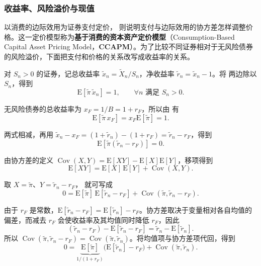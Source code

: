 \begingroup
\renewcommand{\thewjFigure}{\thechapter.S\arabic{wjFigure}}%
\endgroup

\subsubsection{收益率、风险溢价与现值}
 以消费的边际效用为证券支付定价， 则说明支付与边际效用的协方差怎样调整价格。这一定价模型称为\textbf{基于消费的资本资产定价模型}（Consumption-Based Capital Asset Pricing Model，\textbf{CCAPM}）。为了比较不同证券相对于无风险债券的风险溢价，下面把支付和价格的关系改写成收益率的关系。

对 $S_n>0$ 的证券，记总收益率 $\tilde x_n=\widetilde X_n/S_n$，净收益率 $\tilde r_n=\tilde x_n-1$。将 两边除以 $S_n$，得到
\begin{equation}
 \mathrm E[\widetilde\pi\,\tilde x_n]=1,
 \qquad \forall n\text{ 满足 } S_n>0.
 \label{eq:wj-10-19}
\end{equation}

无风险债券的总收益率为 $x_F=1/B=1+r_F$，所以由 有
\[
 \mathrm E[\widetilde\pi\,x_F]=x_F\mathrm E[\widetilde\pi]=1.
\]

两式相减，再用 $\tilde x_n-x_F=(1+\tilde r_n)-(1+r_F)=\tilde r_n-r_F$，得到
\begin{equation}
 \mathrm E[\widetilde\pi(\tilde r_n-r_F)]=0.
 \label{eq:wj-10-20}
\end{equation}

由协方差的定义 $\operatorname{Cov}(X,Y)=\mathrm E[XY]-\mathrm E[X]\mathrm E[Y]$，移项得到
\[
 \mathrm E[XY]=\mathrm E[X]\,\mathrm E[Y]+\operatorname{Cov}(X,Y).
\]

取 $X=\widetilde\pi$、$Y=\tilde r_n-r_F$， 就可写成
\[
 0=\mathrm E[\widetilde\pi]\,\mathrm E[\tilde r_n-r_F]
   +\operatorname{Cov}(\widetilde\pi,\tilde r_n-r_F).
\]

由于 $r_F$ 是常数，$\mathrm E[\tilde r_n-r_F]=\mathrm E[\tilde r_n]-r_F$。协方差取决于变量相对各自均值的偏差，而减去 $r_F$ 会使收益率及其均值同时降低 $r_F$，因此
\[
 (\tilde r_n-r_F)-\mathrm E[\tilde r_n-r_F]
 =\tilde r_n-\mathrm E[\tilde r_n].
\]
所以 $\operatorname{Cov}(\widetilde\pi,\tilde r_n-r_F)=\operatorname{Cov}(\widetilde\pi,\tilde r_n)$。将均值项与协方差项代回，得到
\[
 0=\underbrace{\mathrm E[\widetilde\pi]}_{1/(1+r_F)}
   \bigl(\mathrm E[\tilde r_n]-r_F\bigr)+\operatorname{Cov}(\widetilde\pi,\tilde r_n).
\]

